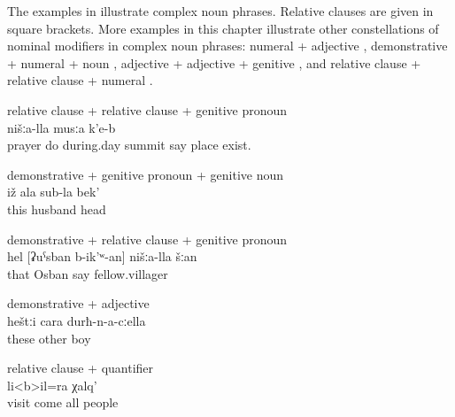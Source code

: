 The examples in  illustrate complex noun phrases. Relative clauses are given in square brackets. More examples in this chapter illustrate other constellations of nominal modifiers in complex noun phrases: numeral + adjective , demonstrative + numeral + noun , adjective + adjective + genitive , and relative clause + relative clause + numeral .
%
\begin{exe}
		\ex	relative clause + relative clause + genitive pronoun\\	\label{ex:There is our place, called the midday summit, the praying summit@10a}
			nišːa-lla	musːa	k'e-b\\
			prayer	do	during.day	summit	say		place	exist.\\
		\glt	{}

		\ex	demonstrative + genitive pronoun + genitive noun\\	\label{ex:your husband's head@10b}
		\gll	iž	ala	sub-la	bek'\\
			this		husband	head\\
		\glt	{}

		\ex	demonstrative + relative clause + genitive pronoun\\	\label{ex:that our fellow villager called Osban}
		\gll	hel	[ʡuˁsban	b-ik'ʷ-an]	nišːa-lla	šːan\\
			that	Osban	say		fellow.villager\\
		\glt	{}


		\ex	demonstrative + adjective\\				\label{ex:with these other boys}
		\gll	heštːi	cara	durħ-n-a-cːella\\
			these	other	boy\\
		\glt	{}
		
				\ex	relative clause + quantifier\\		\label{ex:all people who had come for a visit@11b}
		\gll	[šːatːir	sa-b-ač'-ib-te]	li<b>il=ra	χalq'\\
			visit	come 	all	people\\
		\glt	{}

\end{exe}

